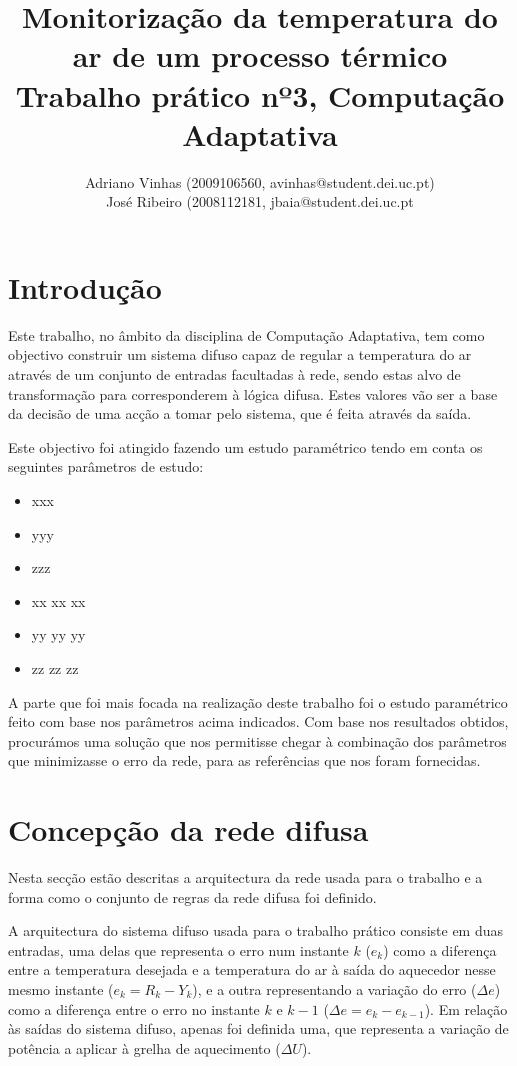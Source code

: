 \documentclass{article}
\begin{document}
\title{Monitorização da temperatura do ar de um processo térmico \\ Trabalho prático nº3, Computação Adaptativa}
\author{Adriano Vinhas (2009106560, avinhas@student.dei.uc.pt)\\
		José Ribeiro (2008112181, jbaia@student.dei.uc.pt}
\maketitle
\clearpage

\section{Introdução}

\indent \indent Este trabalho, no âmbito da disciplina de Computação Adaptativa, tem como objectivo construir um sistema difuso capaz de regular a temperatura do ar através de um conjunto de entradas facultadas à rede, sendo estas alvo de transformação para corresponderem à lógica difusa. Estes valores vão ser a base da decisão de uma acção a tomar pelo sistema, que é feita através da saída.

Este objectivo foi atingido fazendo um estudo paramétrico tendo em conta os seguintes parâmetros de estudo:
\begin{itemize}
\item xxx
\item yyy
\item zzz
\item xx xx xx
\item yy yy yy
\item zz zz zz
\end{itemize}

A parte que foi mais focada na realização deste trabalho foi o estudo paramétrico feito com base nos parâmetros acima indicados. Com base nos resultados obtidos, procurámos uma solução que nos permitisse chegar à combinação dos parâmetros que minimizasse o erro da rede, para as referências que nos foram fornecidas.

\clearpage
\section{Concepção da rede difusa}
\indent \indent Nesta secção estão descritas a arquitectura da rede usada para o trabalho e a forma como o conjunto de regras da rede difusa foi definido.

A arquitectura do sistema difuso usada para o trabalho prático consiste em duas entradas, uma delas que representa o erro num instante $k$ ($e_{k}$) como a diferença entre a temperatura desejada e a temperatura do ar à saída do aquecedor nesse mesmo instante ($e_{k} = R_{k} - Y_{k}$), e a outra representando a variação do erro ($\Delta e$) como a diferença entre o erro no instante $k$ e $k-1$ ($\Delta e=e_{k}-e_{k-1}$). Em relação às saídas do sistema difuso, apenas foi definida uma, que representa a variação de potência a aplicar à grelha de aquecimento ($\Delta U$).
\end{document}
